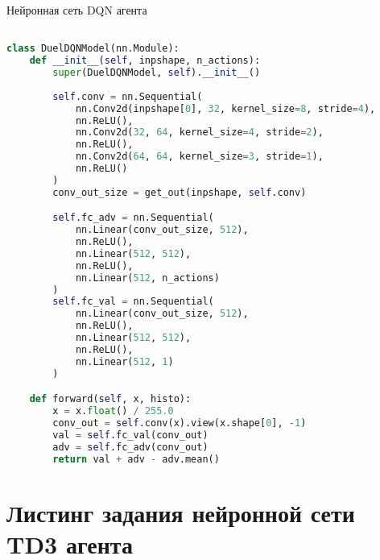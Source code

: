\begin{ListingEnv}[!h]
\captiondelim{ }
\caption{Нейронная сеть DQN агента}\label{lst:dqn}

\begin{lstlisting}[language=Python]

class DuelDQNModel(nn.Module):
    def __init__(self, inpshape, n_actions):
        super(DuelDQNModel, self).__init__()
        
        self.conv = nn.Sequential(
            nn.Conv2d(inpshape[0], 32, kernel_size=8, stride=4),
            nn.ReLU(),
            nn.Conv2d(32, 64, kernel_size=4, stride=2),
            nn.ReLU(),
            nn.Conv2d(64, 64, kernel_size=3, stride=1),
            nn.ReLU()
        )
        conv_out_size = get_out(inpshape, self.conv)

        self.fc_adv = nn.Sequential(
            nn.Linear(conv_out_size, 512),
            nn.ReLU(),
            nn.Linear(512, 512),
            nn.ReLU(),
            nn.Linear(512, n_actions)
        )
        self.fc_val = nn.Sequential(
            nn.Linear(conv_out_size, 512),
            nn.ReLU(),
            nn.Linear(512, 512),
            nn.ReLU(),
            nn.Linear(512, 1)
        )

    def forward(self, x, histo):
        x = x.float() / 255.0
        conv_out = self.conv(x).view(x.shape[0], -1)
        val = self.fc_val(conv_out)
        adv = self.fc_adv(conv_out)
        return val + adv - adv.mean()
\end{lstlisting}
\end{ListingEnv}

\section{Листинг задания нейронной сети TD3 агента}\label{app:A4}

